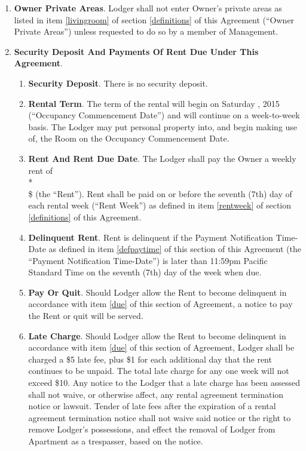\documentclass[12pt,letterpaper]{article}
\newcommand{\datefillin}{\hspace{0.2cm}\makebox[3cm]{\hrulefill}}
\newcommand{\lodger}{Lodger}
\newcommand{\management}{Management}
\newcommand{\apt}{Apartment}
\newcommand{\room}{Room}
\newcommand{\furniture}{Furniture, Kitchenware, Linen, etc.}
\newcommand{\livingroom}{Owner Private Areas}
\newcommand{\firstday}{Occupancy Commencement Date}
\newcommand{\rentweek}{Rent Week}
\newcommand{\paymenttime}{Payment Notification Time-Date}
\begin{document}
\begin{enumerate}
\begin{enumerate}
				\item \textbf{\furniture{}}. \management{} shall provide the \furniture{} listed in item \ref{furniture} of section \ref{definitions} of this Agreement{} (``\furniture{}'') in usable condition and maintain same in usable condition during the time \room{} is rented to \lodger{}.
			\end{enumerate}
		\item \textbf{\livingroom{}}. \lodger{} shall not enter Owner's private areas as listed in item \ref{livingroom} of section \ref{definitions} of this Agreement (``\livingroom{}'') unless requested to do so by a member of \management{}.
		\item \textbf{Security Deposit And Payments Of Rent Due Under This Agreement}. 
			\begin{enumerate}
				\item \textbf{Security Deposit}. There is no security deposit. 
				\item \textbf{Rental Term}. The term of the rental will begin on Saturday \datefillin, 2015 (``\firstday{}'') and will continue on a week-to-week basis. The \lodger{} may put personal property into, and begin making use of, the \room{} on the \firstday{}.
				\item \textbf{Rent And Rent Due Date}. The \lodger{} shall pay the Owner a weekly rent of\\* \\ 
					\$\datefillin{} (the ``Rent''). Rent shall be paid on or before the seventh (7th) day of each rental week (``\rentweek{}'') as defined in item \ref{rentweek} of section \ref{definitions} of this Agreement. 
				\item \textbf{Delinquent Rent}. \label{due}
						Rent is delinquent if the \paymenttime{} as defined in item \ref{defpaytime} of this section of this Agreement (the ``\paymenttime{}'') is later than 11:59pm Pacific Standard Time on the seventh (7th) day of the week when due. 
				\item \textbf{Pay Or Quit}. Should \lodger{} allow the Rent to become delinquent in accordance with item \ref{due} of this section of Agreement, a notice to pay the Rent or quit will be served. 
				\item \textbf{Late Charge}. Should \lodger{} allow the Rent to become delinquent in accordance with item \ref{due} of this section of Agreement, \lodger{} shall be charged a \$5 late fee, plus \$1 for each additional day that the rent continues to be unpaid.  The total late charge for any one week will not exceed \$10. Any notice to the \lodger{} that a late charge has been assessed shall not waive, or otherwise affect, any rental agreement termination notice or lawsuit. Tender of late fees after the expiration of a rental agreement termination notice shall not waive said notice or the right to remove \lodger{}'s possessions, and effect the removal of \lodger{} from \apt{} as a trespasser, based on the notice. 

\end{enumerate}
\end{enumerate}
\end{document}
